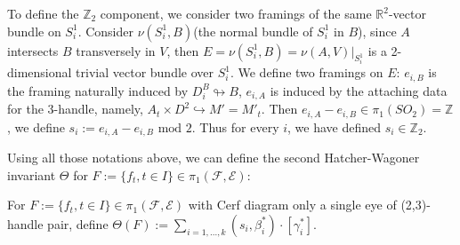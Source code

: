 To define the $\mathbb{Z}_2$ component, we consider two framings of the same $\mathbb{R}^2$-vector bundle on $S_i^1$. Consider $\nu (S_i^1, B)$(the normal bundle of $S_i^1$ in $B$), since $A$ intersects $B$ transversely in $V$, then $E=\nu (S_i^1, B)=\nu (A,V)|_{S_i^1}$ is a 2-dimensional trivial vector bundle over $S_i^1$. We define two framings on $E$: $e_{i,B}$ is the framing naturally induced by $D^B_i\looparrowright B$, $e_{i,A}$ is induced by the attaching data for the 3-handle, namely, $A_t\times D^2\hookrightarrow M'=M'_t$. Then $e_{i,A}-e_{i,B}\in \pi_1(SO_2)=\mathbb{Z}$, we define $s_i:=e_{i,A}-e_{i,B} \text{ mod }2$. Thus for every $i$, we have defined $s_i\in \mathbb{Z}_2$.

Using all those notations above, we can define the second Hatcher-Wagoner invariant $\Theta$ for $F:=\{f_t,t\in I\}\in \pi_1(\mathcal{F},\mathcal{E})$:
\begin{definition}
    For $F:=\{f_t,t\in I\}\in \pi_1(\mathcal{F},\mathcal{E})$ with Cerf diagram only a single eye of (2,3)-handle pair, define $\Theta(F):=\sum_{i=1,...,k} (s_i, \beta_i^*)\cdot [\gamma_i^*]$. 
\end{definition}

